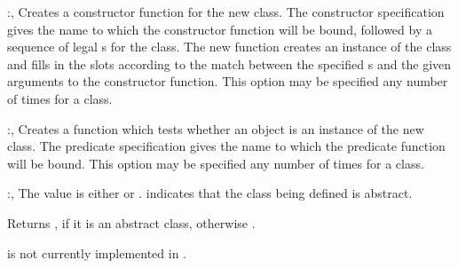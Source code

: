 \begin{optDefinition}
\begin{options}
    \item[\keyworddef{constructor}:, \scref{constructor-specification}]%
    Creates a constructor function for the new class.  The constructor
    specification gives the name to which the constructor function will be
    bound, followed by a sequence of legal s for the class.  The
    new function creates an instance of the class and fills in the slots
    according to the match between the specified s and the given
    arguments to the constructor function.  This option may be specified any
    number of times for a class.

    \item[\keyworddef{predicate}:, \scref{identifier}]%
    Creates a function which tests whether an object is an instance of the new
    class.  The predicate specification gives the name to which the predicate
    function will be bound.  This option may be specified any number of times
    for a class.

    \item[\keyworddef{abstractp}:, \scref{boolean}]%
    The value is either \true{} or \nil{}. \true{} indicates that the class
    being defined is abstract.
%
\end{options}
%
\end{optDefinition}
%
%
\Signature
{}
%
%
\begin{arguments}
    \item[\scref{object}] Returns , if it is an abstract class,
    otherwise \nil{}.
\end{arguments}
%
\begin{note}
     is not currently implemented in \youtoo.
\end{note}
%

